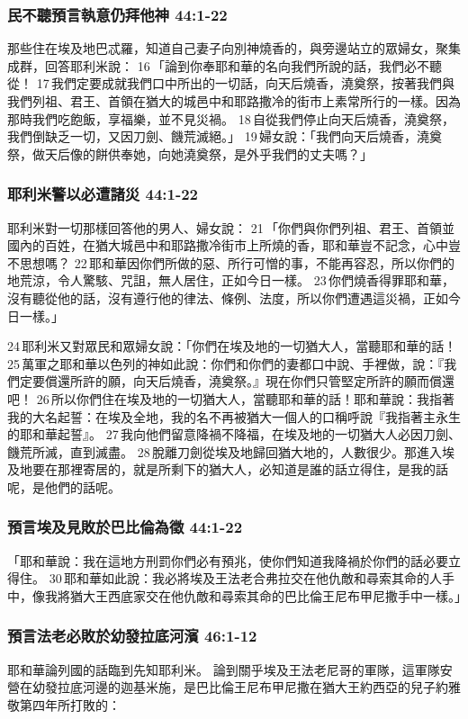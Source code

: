 \subsubsection{民不聽預言執意仍拜他神 44:1-22}
那些住在埃及地巴忒羅，知道自己妻子向別神燒香的，與旁邊站立的眾婦女，聚集成群，回答耶利米說： 16 「論到你奉耶和華的名向我們所說的話，我們必不聽從！ 17 我們定要成就我們口中所出的一切話，向天后燒香，澆奠祭，按著我們與我們列祖、君王、首領在猶大的城邑中和耶路撒冷的街市上素常所行的一樣。因為那時我們吃飽飯，享福樂，並不見災禍。 18 自從我們停止向天后燒香，澆奠祭，我們倒缺乏一切，又因刀劍、饑荒滅絕。」 19 婦女說：「我們向天后燒香，澆奠祭，做天后像的餅供奉她，向她澆奠祭，是外乎我們的丈夫嗎？」

\subsubsection{耶利米警以必遭諸災 44:1-22}
耶利米對一切那樣回答他的男人、婦女說： 21 「你們與你們列祖、君王、首領並國內的百姓，在猶大城邑中和耶路撒冷街市上所燒的香，耶和華豈不記念，心中豈不思想嗎？ 22 耶和華因你們所做的惡、所行可憎的事，不能再容忍，所以你們的地荒涼，令人驚駭、咒詛，無人居住，正如今日一樣。 23 你們燒香得罪耶和華，沒有聽從他的話，沒有遵行他的律法、條例、法度，所以你們遭遇這災禍，正如今日一樣。」

24 耶利米又對眾民和眾婦女說：「你們在埃及地的一切猶大人，當聽耶和華的話！ 25 萬軍之耶和華以色列的神如此說：你們和你們的妻都口中說、手裡做，說：『我們定要償還所許的願，向天后燒香，澆奠祭。』現在你們只管堅定所許的願而償還吧！ 26 所以你們住在埃及地的一切猶大人，當聽耶和華的話！耶和華說：我指著我的大名起誓：在埃及全地，我的名不再被猶大一個人的口稱呼說『我指著主永生的耶和華起誓』。 27 我向他們留意降禍不降福，在埃及地的一切猶大人必因刀劍、饑荒所滅，直到滅盡。 28 脫離刀劍從埃及地歸回猶大地的，人數很少。那進入埃及地要在那裡寄居的，就是所剩下的猶大人，必知道是誰的話立得住，是我的話呢，是他們的話呢。

\subsubsection{預言埃及見敗於巴比倫為徵 44:1-22}
「耶和華說：我在這地方刑罰你們必有預兆，使你們知道我降禍於你們的話必要立得住。 30 耶和華如此說：我必將埃及王法老合弗拉交在他仇敵和尋索其命的人手中，像我將猶大王西底家交在他仇敵和尋索其命的巴比倫王尼布甲尼撒手中一樣。」

\subsubsection{預言法老必敗於幼發拉底河濱 46:1-12}
耶和華論列國的話臨到先知耶利米。
論到關乎埃及王法老尼哥的軍隊，這軍隊安營在幼發拉底河邊的迦基米施，是巴比倫王尼布甲尼撒在猶大王約西亞的兒子約雅敬第四年所打敗的：


